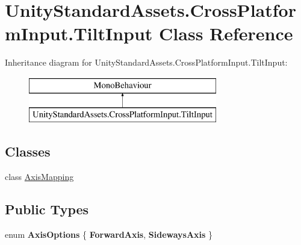 \hypertarget{class_unity_standard_assets_1_1_cross_platform_input_1_1_tilt_input}{}\section{Unity\+Standard\+Assets.\+Cross\+Platform\+Input.\+Tilt\+Input Class Reference}
\label{class_unity_standard_assets_1_1_cross_platform_input_1_1_tilt_input}
Inheritance diagram for Unity\+Standard\+Assets.\+Cross\+Platform\+Input.\+Tilt\+Input\+:\begin{figure}[H]
\begin{center}
\leavevmode
\includegraphics[height=2.000000cm]{class_unity_standard_assets_1_1_cross_platform_input_1_1_tilt_input}
\end{center}
\end{figure}
\subsection*{Classes}
\begin{DoxyCompactItemize}
\item 
class \hyperlink{class_unity_standard_assets_1_1_cross_platform_input_1_1_tilt_input_1_1_axis_mapping}{Axis\+Mapping}
\end{DoxyCompactItemize}
\subsection*{Public Types}
\begin{DoxyCompactItemize}
\item 
enum {\bfseries Axis\+Options} \{ {\bfseries Forward\+Axis}, 
{\bfseries Sideways\+Axis}
 \}\hypertarget{class_unity_standard_assets_1_1_cross_platform_input_1_1_tilt_input_a33494fd997ae63aea22ffb585244f187}{}\label{class_unity_standard_assets_1_1_cross_platform_input_1_1_tilt_input_a33494fd997ae63aea22ffb585244f187}

\end{DoxyCompactItemize}
